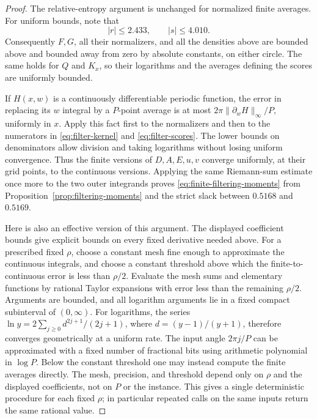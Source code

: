 \begin{proof}
The relative-entropy argument is unchanged for normalized finite
averages.  For uniform bounds, note that
\[
 |r|\le2.433,\qquad |s|\le4.010.
\]
Consequently $F,G$, all their normalizers, and all the densities above
are bounded above and bounded away from zero by absolute constants,
on either circle.  The same holds for $Q$ and $K_x$, so their logarithms
and the averages defining the scores are uniformly bounded.

If $H(x,w)$ is a continuously differentiable periodic function, the
error in replacing its $w$ integral by a $P$-point average is at most
$2\pi\|\partial_w H\|_\infty/P$, uniformly in $x$.  Apply this fact
first to the normalizers and then to the numerators in
\eqref{eq:filter-kernel} and \eqref{eq:filter-scores}.  The lower bounds
on denominators allow division and taking logarithms without losing
uniform convergence.  Thus the finite versions of $D,A,E,u,v$
converge uniformly, at their grid points, to the continuous versions.
Applying the same Riemann-sum estimate once more to the two outer
integrands proves \eqref{eq:finite-filtering-moments} from
Proposition~\ref{prop:filtering-moments} and the strict slack between
$0.5168$ and $0.5169$.

Here is also an effective version of this argument.  The displayed
coefficient bounds give explicit bounds on every fixed derivative
needed above.  For a prescribed fixed $\rho$, choose a constant mesh
fine enough to approximate the continuous integrals, and choose a
constant threshold above which the finite-to-continuous error is less
than $\rho/2$.  Evaluate the mesh sums and elementary functions by
rational Taylor expansions with error less than the remaining
$\rho/2$.  Arguments are bounded, and all logarithm arguments lie in a
fixed compact subinterval of $(0,\infty)$.  For logarithms, the series
$\ln y=2\sum_{j\ge0}d^{2j+1}/(2j+1)$, where $d=(y-1)/(y+1)$,
therefore converges geometrically at a uniform rate.  The input angle
$2\pi j/P$ can be approximated with
a fixed number of fractional bits using arithmetic polynomial in
$\log P$.  Below the constant threshold one may instead compute the
finite averages directly.  The mesh, precision, and threshold depend
only on $\rho$ and the displayed coefficients, not on $P$ or the
instance.  This gives a single deterministic procedure for each fixed
$\rho$; in particular repeated calls on the same inputs return the
same rational value.
\end{proof}
